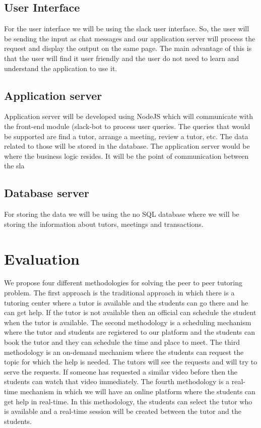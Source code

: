 \documentclass{sig-alternate-05-2015}
\begin{document}
\subsection{User Interface}
For the user interface we will be using the slack user interface. So, the user will be sending the input as chat messages and our application server will process the request and display the output on the same page. The main advantage of this is that the user will find it user friendly and the user do not need to learn and understand the application to use it.

\subsection{Application server}
Application server will be developed using NodeJS which will communicate with the front-end module (slack-bot to process user queries. The queries that would be supported are find a tutor, arrange a meeting, review a tutor, etc. The data related to those will be stored in the database. The application server would be where the business logic resides. It will be the point of communication between the sla

\subsection{Database server}
For storing the data we will be using the no SQL database where we will be storing the information about tutors, meetings and transactions.



\section{Evaluation}

We propose four different methodologies for solving the peer to peer tutoring problem. The first approach is the traditional approach in which there is a tutoring center where a tutor is available and the students can go there and he can get help. If the tutor is not available then an official can schedule the student when the tutor is available. The second methodology is a scheduling mechanism where the tutor and students are registered to our platform and the students can book the tutor and they can schedule the time and place to meet. The third methodology is an on-demand mechanism where the students can request the topic for which the help is needed.  The tutors will see the requests and will try to serve the requests. If someone has requested a similar video before then the students can watch that video immediately. The fourth methodology is a real-time mechanism in which we will have an online platform where the students can get help in real-time. In this methodology, the students can select the tutor who is available and a real-time session will be created between the tutor and the students.
\end{document}
